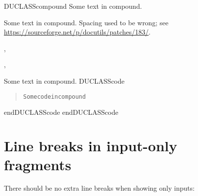 \documentclass[a4paper]{article}
\newenvironment{DUclass}[1]%
  {%
   \def\DocutilsClassFunctionName{DUCLASS#1}
     \csname \DocutilsClassFunctionName \endcsname}%
  {\csname end\DocutilsClassFunctionName \endcsname}%
\begin{document}
\begin{DUclass}{compound}
Some text in compound.

Some text in compound.  Spacing used to be wrong; see \url{https://sourceforge.net/p/docutils/patches/183/}.
\begin{alectryon}
  \sep
  \begin{txt}
  \end{txt}
\end{alectryon}
\begin{alectryon}
  \sep
  \begin{txt}
  \end{txt}
\end{alectryon}
Some text in compound.
\begin{DUclass}{code}
\begin{quote}
\begin{alltt}
Some code in compound
\end{alltt}
\end{quote}
\end{DUclass}
\end{DUclass}


\section{Line breaks in input-only fragments%
  \label{line-breaks-in-input-only-fragments}%
}

There should be no extra line breaks when showing only inputs:
\end{document}
